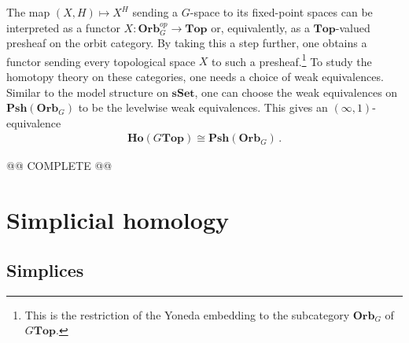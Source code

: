     \begin{theorem}[Elmendorf]
        The map $(X,H)\mapsto X^H$ sending a $G$-space to its fixed-point spaces can be interpreted as a functor $X:\mathbf{Orb}_G^{op}\rightarrow\mathbf{Top}$ or, equivalently, as a $\mathbf{Top}$-valued presheaf on the orbit category. By taking this a step further, one obtains a functor sending every topological space $X$ to such a presheaf.\footnote{This is the restriction of the Yoneda embedding to the subcategory $\mathbf{Orb}_G$ of $G\mathbf{Top}$.} To study the homotopy theory on these categories, one needs a choice of weak equivalences. Similar to the model structure on $\mathbf{sSet}$, one can choose the weak equivalences on $\mathbf{Psh}(\mathbf{Orb}_G)$ to be the levelwise weak equivalences. This gives an $(\infty,1)$-equivalence
        \begin{gather}
            \mathbf{Ho}(G\mathbf{Top})\cong\mathbf{Psh}(\mathbf{Orb}_G)\,.
        \end{gather}
    \end{theorem}

    @@ COMPLETE @@

\section{Simplicial homology}\label{section:homology}
\subsection{Simplices}

